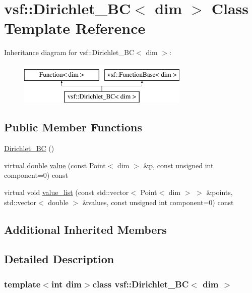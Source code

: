 \hypertarget{classvsf_1_1Dirichlet__BC}{\section{vsf\-:\-:Dirichlet\-\_\-\-B\-C$<$ dim $>$ Class Template Reference}
\label{classvsf_1_1Dirichlet__BC}
}
Inheritance diagram for vsf\-:\-:Dirichlet\-\_\-\-B\-C$<$ dim $>$\-:\begin{figure}[H]
\begin{center}
\leavevmode
\includegraphics[height=2.000000cm]{classvsf_1_1Dirichlet__BC}
\end{center}
\end{figure}
\subsection*{Public Member Functions}
\begin{DoxyCompactItemize}
\item 
\hyperlink{classvsf_1_1Dirichlet__BC_a3fc7bb6aef647db39b9f1d4664b3740b}{Dirichlet\-\_\-\-B\-C} ()
\item 
virtual double \hyperlink{classvsf_1_1Dirichlet__BC_a9996ee81e6748568e3b069c12afdd674}{value} (const Point$<$ dim $>$ \&p, const unsigned int component=0) const 
\item 
virtual void \hyperlink{classvsf_1_1Dirichlet__BC_a883de335cd0c7709fba4b58d43a4dd4d}{value\-\_\-list} (const std\-::vector$<$ Point$<$ dim $>$ $>$ \&points, std\-::vector$<$ double $>$ \&values, const unsigned int component=0) const 
\end{DoxyCompactItemize}
\subsection*{Additional Inherited Members}


\subsection{Detailed Description}
\subsubsection*{template$<$int dim$>$class vsf\-::\-Dirichlet\-\_\-\-B\-C$<$ dim $>$}

